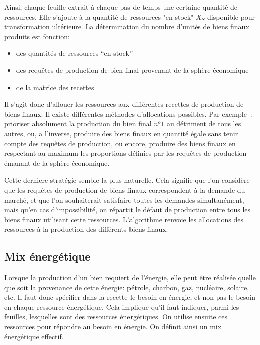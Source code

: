 \documentclass[12pt,a4paper]{article}%
\begin{document}
Ainsi, chaque feuille extrait à chaque pas de temps une certaine quantité
de ressources. Elle s'ajoute à la quantité de ressources "en stock"
$X_{S}$ disponible pour transformation ultérieure. La détermination du nombre
d'unités de biens finaux produits est fonction:

\begin{itemize}
\item des quantités de ressources ``en stock''

\item des requêtes de production de bien final provenant de la sphère économique

\item de la matrice des recettes~
\end{itemize}

Il s'agit donc d'allouer les ressources aux différentes recettes de production
de biens finaux. Il existe différentes méthodes d'allocations possibles. Par
exemple~: prioriser absolument la production du bien final $n^{o}1$ au
détriment de tous les autres, ou, a l'inverse, produire des biens finaux en
quantité égale sans tenir compte des requêtes de production, ou encore,
produire des biens finaux en respectant au maximum les proportions définies
par les requêtes de production émanant de la sphère économique.

Cette derniere stratégie semble la plus naturelle. Cela signifie que l'on
considère que les requêtes de production de biens finaux correspondent
à la demande du marché, et que l'on souhaiterait satisfaire toutes les
demandes simultanément, mais qu'en cas d'impossibilité, on répartit le défaut
de production entre tous les biens finaux utilisant cette ressources.
L'algorithme renvoie les allocations des ressources à la production des
différents biens finaux.

\subsection{Mix énergétique}

Lorsque la production d'un bien requiert de l'énergie, elle peut être réalisée
quelle que soit la provenance de cette énergie: pétrole, charbon, gaz,
nucléaire, solaire, etc. Il faut donc spécifier dans la recette le besoin en
énergie, et non pas le besoin en chaque ressource énergétique. Cela implique
qu'il faut indiquer, parmi les feuilles, lesquelles sont des ressources
énergétiques. On utilise ensuite ces ressources pour répondre au besoin en
énergie. On définit ainsi un mix énergétique effectif.
\end{document}
